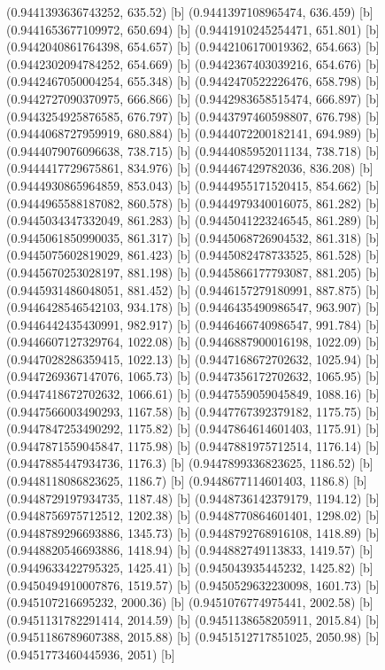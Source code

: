 {{{(0.9441393636743252, 635.52) [b] 
(0.9441397108965474, 636.459) [b] 
(0.9441653677109972, 650.694) [b] 
(0.9441910245254471, 651.801) [b] 
(0.9442040861764398, 654.657) [b] 
(0.9442106170019362, 654.663) [b] 
(0.9442302094784252, 654.669) [b] 
(0.9442367403039216, 654.676) [b] 
(0.9442467050004254, 655.348) [b] 
(0.9442470522226476, 658.798) [b] 
(0.9442727090370975, 666.866) [b] 
(0.9442983658515474, 666.897) [b] 
(0.9443254925876585, 676.797) [b] 
(0.9443797460598807, 676.798) [b] 
(0.9444068727959919, 680.884) [b] 
(0.9444072200182141, 694.989) [b] 
(0.9444079076096638, 738.715) [b] 
(0.9444085952011134, 738.718) [b] 
(0.9444417729675861, 834.976) [b] 
(0.944467429782036, 836.208) [b] 
(0.9444930865964859, 853.043) [b] 
(0.9444955171520415, 854.662) [b] 
(0.9444965588187082, 860.578) [b] 
(0.9444979340016075, 861.282) [b] 
(0.9445034347332049, 861.283) [b] 
(0.9445041223246545, 861.289) [b] 
(0.9445061850990035, 861.317) [b] 
(0.9445068726904532, 861.318) [b] 
(0.9445075602819029, 861.423) [b] 
(0.9445082478733525, 861.528) [b] 
(0.9445670253028197, 881.198) [b] 
(0.9445866177793087, 881.205) [b] 
(0.9445931486048051, 881.452) [b] 
(0.9446157279180991, 887.875) [b] 
(0.9446428546542103, 934.178) [b] 
(0.9446435490986547, 963.907) [b] 
(0.9446442435430991, 982.917) [b] 
(0.9446466740986547, 991.784) [b] 
(0.9446607127329764, 1022.08) [b] 
(0.9446887900016198, 1022.09) [b] 
(0.9447028286359415, 1022.13) [b] 
(0.9447168672702632, 1025.94) [b] 
(0.9447269367147076, 1065.73) [b] 
(0.9447356172702632, 1065.95) [b] 
(0.9447418672702632, 1066.61) [b] 
(0.9447559059045849, 1088.16) [b] 
(0.9447566003490293, 1167.58) [b] 
(0.9447767392379182, 1175.75) [b] 
(0.9447847253490292, 1175.82) [b] 
(0.9447864614601403, 1175.91) [b] 
(0.9447871559045847, 1175.98) [b] 
(0.9447881975712514, 1176.14) [b] 
(0.9447885447934736, 1176.3) [b] 
(0.9447899336823625, 1186.52) [b] 
(0.9448118086823625, 1186.7) [b] 
(0.9448677114601403, 1186.8) [b] 
(0.9448729197934735, 1187.48) [b] 
(0.9448736142379179, 1194.12) [b] 
(0.9448756975712512, 1202.38) [b] 
(0.9448770864601401, 1298.02) [b] 
(0.9448789296693886, 1345.73) [b] 
(0.9448792768916108, 1418.89) [b] 
(0.9448820546693886, 1418.94) [b] 
(0.944882749113833, 1419.57) [b] 
(0.9449633422795325, 1425.41) [b] 
(0.945043935445232, 1425.82) [b] 
(0.9450494910007876, 1519.57) [b] 
(0.9450529632230098, 1601.73) [b] 
(0.945107216695232, 2000.36) [b] 
(0.9451076774975441, 2002.58) [b] 
(0.9451131782291414, 2014.59) [b] 
(0.9451138658205911, 2015.84) [b] 
(0.9451186789607388, 2015.88) [b] 
(0.9451512717851025, 2050.98) [b] 
(0.9451773460445936, 2051) [b] 
}}}
